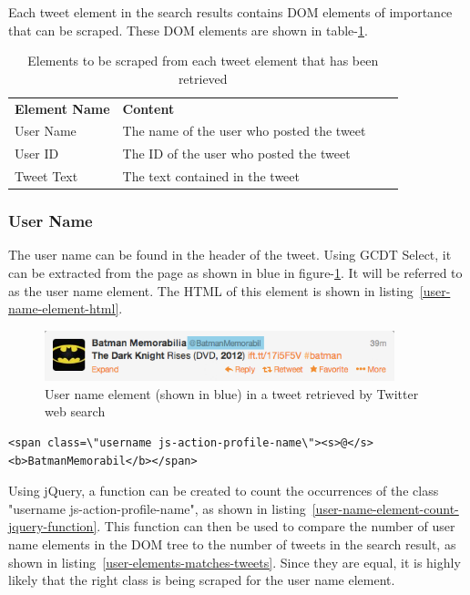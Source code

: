 Each tweet element in the search results contains DOM elements of importance that can be scraped.
These DOM elements are shown in table-\ref{table:important-tweet-element-elements}.

\begin{table}[H]
\centering
\begin{tabularx}{5.3\textwidth}{ lp{7cm} lp{5cm} }
  \textbf{Element Name} & \textbf{Content}\\
  \cline{0-1}
  User Name & The name of the user who posted the tweet \\
  \cline{0-1}
  User ID & The ID of the user who posted the tweet \\
  \cline{0-1}
  Tweet Text & The text contained in the tweet
\end{tabularx}
\caption[Elements to be scraped from tweets]{Elements to be scraped from each tweet element that has been retrieved}
\label{table:important-tweet-element-elements}
\end{table}

\subsubsection{User Name}
The user name can be found in the header of the tweet. Using GCDT Select, it can be extracted from the page as shown in blue in figure-\ref{figure:tweet-user-field}. It will be referred to as the user name element. The HTML of this element is shown in listing~\ref{user-name-element-html}.

\begin{figure}[H]
\includegraphics[width=4in]{image/tweet-user-field.png}
\centering
\caption[User name element in tweet]{User name element (shown in blue) in a tweet retrieved by Twitter web search}
\label{figure:tweet-user-field}
\end{figure}

\begin{lstlisting}[caption={HTML of the user name element in a tweet},label={user-name-element-html},captionpos=b]
  <span class=\"username js-action-profile-name\"><s>@</s><b>BatmanMemorabil</b></span>
\end{lstlisting}

\noindent
Using jQuery, a function can be created to count the occurrences of the class "username js-action-profile-name", as shown in listing~\ref{user-name-element-count-jquery-function}. This function can then be used to compare the number of user name elements in the DOM tree to the number of tweets in the search result, as shown in listing~\ref{user-elements-matches-tweets}. Since they are equal, it is highly likely that the right class is being scraped for the user name element.

